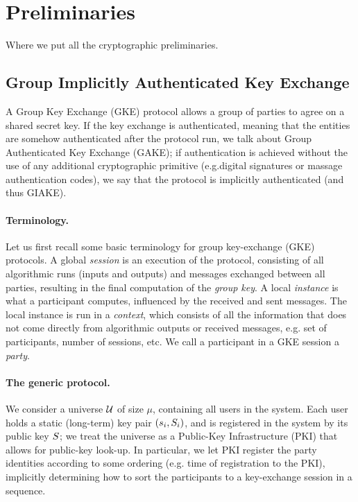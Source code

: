 \section{Preliminaries}\label{sec:preliminaries}
Where we put all the cryptographic preliminaries.

\subsection{Group Implicitly Authenticated Key Exchange}\label{subsec:GIAKE}
A Group Key Exchange (GKE) protocol allows a group of parties to agree on a shared secret key. 
If the key exchange is authenticated, meaning that the entities are somehow authenticated after the protocol run, we talk about Group Authenticated Key Exchange (GAKE); if authentication is achieved without the use of any additional cryptographic primitive (e.g.digital signatures or massage authentication codes), we say that the protocol is implicitly authenticated (and thus GIAKE).

\paragraph{Terminology.} Let us first recall some basic terminology for group key-exchange (GKE) protocols.
A global \textit{session} is an execution of the protocol, consisting of all algorithmic runs (inputs and outputs) and messages exchanged between all parties, resulting in the final computation of the \textit{group key}.
A local \textit{instance} is what a participant computes, influenced by the received and sent messages.
The local instance is run in a \textit{context}, which consists of all the information that does not come directly from algorithmic outputs or received messages, e.g. set of participants, number of sessions, etc.
We call a participant in a GKE session a \textit{party}.

\paragraph{The generic protocol.} We consider a universe $\mathcal{U}$ of size $\mu$, containing all users in the system.
Each user holds a static (long-term) key pair $(s_i,S_i)$, and is registered in the system by its public key $S$; we treat the universe as a Public-Key Infrastructure (PKI) that allows for public-key look-up.
In particular, we let PKI register the party identities according to some ordering (e.g. time of registration to the PKI), implicitly determining how to sort the participants to a key-exchange session in a sequence.

